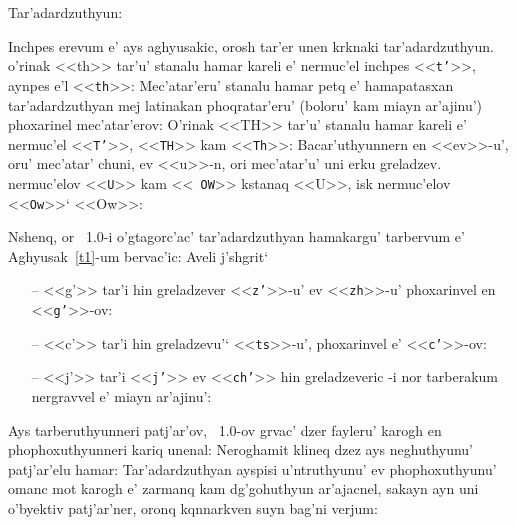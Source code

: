 \documentclass[12pt,a4paper]{article}
\begin{document}
\begin{table}[ht]
\centerline{\vbox{\offinterlineskip
{}}}
\caption{Tar'adardzuthyun:}
\label{t1}
\end{table}

Inchpes erevum e' ays aghyusakic, orosh tar'er unen krknaki
ta\-r'a\-dar\-dzu\-thyun. o'rinak <<th>> tar'u' stanalu hamar kareli e'
nermuc'el inchpes <<{\tt t'}>>, aynpes e'l <<{\tt th}>>: Mec'atar'eru' stanalu
hamar petq e' ha\-ma\-pa\-tas\-xan tar'adardzuthyan mej latinakan
phoqratar'eru' (boloru' kam miayn ar'ajinu') phoxarinel mec'atar'erov: O'rinak
<<TH>> tar'u' sta\-na\-lu hamar kareli e' nermuc'el <<{\tt T'}>>, <<{\tt TH}>>
kam <<{\tt Th}>>: Bacar'uthyunnern en <<ev>>-u', oru' mec'atar' chuni, ev
<<u>>-n, ori mec'atar'u' uni erku greladzev. nermuc'elov <<{\tt U}>> kam <<{\tt
OW}>> kstanaq <<U>>, isk nermuc'elov <<{\tt Ow}>>` <<Ow>>:

Nshenq, or \ArmTeX\ 1.0-i o'gtagorc'ac' tar'adardzuthyan hamakargu' tarbervum
e' Aghyusak~\ref{t1}-um bervac'ic: Aveli j'shgrit`
\begin{itemize}
\item[--]<<g'>> tar'i hin greladzever <<{\tt z'}>>-u' ev <<{\tt zh}>>-u'
phoxarinvel en <<{\tt g'}>>-ov:
\item[--]<<c'>> tar'i hin greladzevu'` <<{\tt ts}>>-u', phoxarinvel e' 
<<{\tt c'}>>-ov:
\item[--]<<j'>> tar'i <<{\tt j'}>> ev <<{\tt ch'}>> hin greladzeveric
\ArmTeX-i nor tarberakum nergravvel e' miayn ar'ajinu':
\end{itemize}

Ays tarberuthyunneri patj'ar'ov, \ArmTeX\ 1.0-ov grvac' dzer fayleru' karogh
en phophoxuthyunneri kariq unenal: Neroghamit klineq dzez ays neghuthyunu'
patj'ar'elu hamar: Tar'adardzuthyan ayspisi u'ntruthyunu' ev phophoxuthyunu'
omanc mot karogh e' zarmanq kam dg'gohuthyun a\-r'a\-jac\-nel, sakayn ayn uni
o'byektiv patj'ar'ner, oronq kqnnarkven suyn bag'ni verjum:
\end{document}
